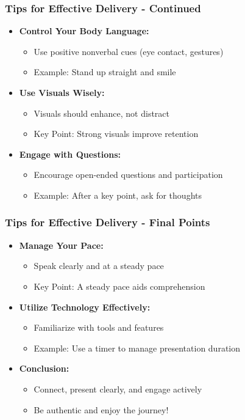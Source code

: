 \documentclass[aspectratio=169]{beamer}
\begin{document}
\begin{frame}[fragile]
    \frametitle{Tips for Effective Delivery - Continued}
    \begin{itemize}
        \item \textbf{Control Your Body Language:}
        \begin{itemize}
            \item Use positive nonverbal cues (eye contact, gestures)
            \item Example: Stand up straight and smile
        \end{itemize}

        \item \textbf{Use Visuals Wisely:}
        \begin{itemize}
            \item Visuals should enhance, not distract
            \item Key Point: Strong visuals improve retention
        \end{itemize}
        
        \item \textbf{Engage with Questions:}
        \begin{itemize}
            \item Encourage open-ended questions and participation
            \item Example: After a key point, ask for thoughts
        \end{itemize}
    \end{itemize}
\end{frame}

\begin{frame}[fragile]
    \frametitle{Tips for Effective Delivery - Final Points}
    \begin{itemize}
        \item \textbf{Manage Your Pace:}
        \begin{itemize}
            \item Speak clearly and at a steady pace
            \item Key Point: A steady pace aids comprehension
        \end{itemize}

        \item \textbf{Utilize Technology Effectively:}
        \begin{itemize}
            \item Familiarize with tools and features
            \item Example: Use a timer to manage presentation duration
        \end{itemize}

        \item \textbf{Conclusion:}
        \begin{itemize}
            \item Connect, present clearly, and engage actively
            \item Be authentic and enjoy the journey!
        \end{itemize}
    \end{itemize}
\end{frame}
\end{document}

